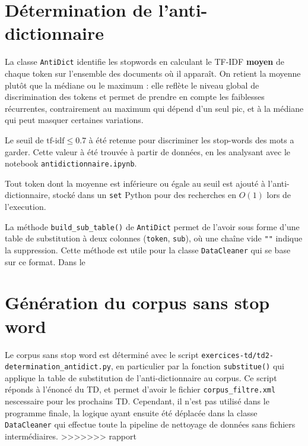 \section{Détermination de l'anti-dictionnaire}

La classe \texttt{AntiDict} identifie les stopwords en calculant le TF-IDF \textbf{moyen} de chaque token sur l'ensemble des documents où il apparaît. On retient la moyenne plutôt que la médiane ou le maximum : elle reflète le niveau global de discrimination des tokens et permet de prendre en compte les faiblesses récurrentes, contrairement au maximum qui dépend d’un seul pic, et à la médiane qui peut masquer certaines variations. 

Le seuil de $\text{tf-idf} \le 0.7$ à été retenue pour discriminer les stop-words des mots a garder. Cette valeur à été trouvée à partir de données, en les analysant avec le notebook \texttt{antidictionnaire.ipynb}.
 
Tout token dont la moyenne est inférieure ou égale au seuil est ajouté à l'anti-dictionnaire, stocké dans un \texttt{set} Python pour des recherches en $O(1)$ lors de l'execution.

La méthode \texttt{build\_sub\_table()} de \texttt{AntiDict} permet de l'avoir sous forme d'une table de substitution à deux colonnes (\texttt{token}, \texttt{sub}), où une chaîne vide \texttt{""} indique la suppression. Cette méthode est utile pour la classe \texttt{DataCleaner} qui se base sur ce format. Dans le 

\section{Génération du corpus sans stop word}

Le corpus sans stop word est déterminé avec le script \texttt{exercices-td/td2-determination\_antidict.py}, en particulier par la fonction \texttt{substitue()} qui applique la table de substitution de l'anti-dictionnaire au corpus. Ce script réponds à l'énoncé du TD, et permet d'avoir le fichier \texttt{corpus\_filtre.xml} nescessaire pour les prochains TD. Cependant, il n'est pas utilisé dans le programme finale, la logique ayant ensuite été déplacée dans la classe \texttt{DataCleaner} qui effectue toute la pipeline de nettoyage de données sans fichiers intermédiaires.  
>>>>>>> rapport

